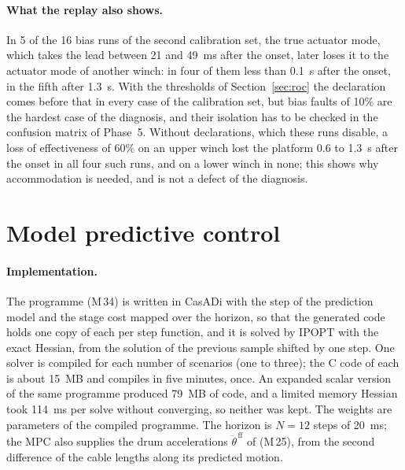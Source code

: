 \documentclass[10pt]{article}
\begin{document}
\paragraph{What the replay also shows.} In 5 of the 16 bias runs of the second calibration set, the true actuator mode, which takes the lead between 21 and 49~ms after the onset, later loses it to the actuator mode of another winch: in four of them less than 0.1~s after the onset, in the fifth after 1.3~s. With the thresholds of Section~\ref{sec:roc} the declaration comes before that in every case of the calibration set, but bias faults of 10\% are the hardest case of the diagnosis, and their isolation has to be checked in the confusion matrix of Phase~5. Without declarations, which these runs disable, a loss of effectiveness of 60\% on an upper winch lost the platform 0.6 to 1.3~s after the onset in all four such runs, and on a lower winch in none; this shows why accommodation is needed, and is not a defect of the diagnosis.

\section{Model predictive control}\label{sec:mpc}

\paragraph{Implementation.} The programme (M\,34) is written in CasADi \citep{andersson2019casadi} with the step of the prediction model and the stage cost mapped over the horizon, so that the generated code holds one copy of each per step function, and it is solved by IPOPT \citep{wachter2006ipopt} with the exact Hessian, from the solution of the previous sample shifted by one step. One solver is compiled for each number of scenarios (one to three); the C code of each is about 15~MB and compiles in five minutes, once. An expanded scalar version of the same programme produced 79~MB of code, and a limited memory Hessian took 114~ms per solve without converging, so neither was kept. The weights are parameters of the compiled programme. The horizon is $N=12$ steps of 20~ms; the MPC also supplies the drum accelerations $\ddot\theta^{\,\mathrm{ff}}$ of (M\,25), from the second difference of the cable lengths along its predicted motion.
\end{document}
